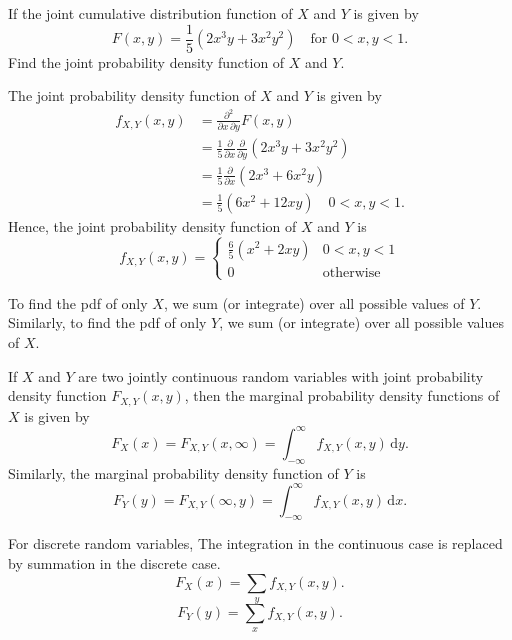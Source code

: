 \begin{example}
    If the joint cumulative distribution function of $X$ and $Y$ is given by 
    \[
        F(x, y) = \frac{1}{5} \left( 2x^3y + 3x^2y^2 \right) \quad 
        \text{for } 0 < x, y < 1.
    \]
    Find the joint probability density function of $X$ and $Y$.
\end{example}
\begin{solution}
    The joint probability density function of $X$ and $Y$ is given by
    \begin{align*}
        f_{X,Y}(x,y) &= \frac{\partial^2}{\partial x \, \partial y} F(x,y)\\
        &= \frac{1}{5} \frac{\partial}{\partial x} \frac{\partial}{\partial y} (2x^3 y + 3x^2 y^2)\\
        &= \frac{1}{5} \frac{\partial}{\partial x} \left( 2x^3 + 6x^2y \right)\\
        &= \frac{1}{5} \left( 6x^2 + 12xy \right) \quad 0 < x, y < 1.
    \end{align*}
    Hence, the joint probability density function of $X$ and $Y$ is
    \[
        f_{X,Y}(x,y) = \begin{cases}
            \displaystyle \frac{6}{5} \left( x^2 + 2xy \right) & 0 < x, y < 1\\[0.6em]
            0 & \text{otherwise}
        \end{cases}
    \]
\end{solution}

To find the pdf of only $X$, we sum (or integrate) over all possible values of $Y$. 
Similarly, to find the pdf of only $Y$, we sum (or integrate) over all possible values of $X$.

\begin{definition}
    If $X$ and $Y$ are two jointly continuous random variables with joint probability density function $F_{X,Y}(x,y)$, then the marginal probability density functions of $X$ is given by
    \begin{equation}
        F_X(x) = F_{X,Y}(x, \infty) = \int_{- \infty}^{\infty} f_{X,Y}(x,y) \, \mathrm{d}y.
    \end{equation}
    Similarly, the marginal probability density function of $Y$ is 
    \begin{equation}
        F_Y(y) = F_{X,Y}(\infty, y) = \int_{- \infty}^{\infty} f_{X,Y}(x,y) \, \mathrm{d}x.
    \end{equation}
\end{definition}
\begin{remark}
    For discrete random variables, 
    The integration in the continuous case is replaced by summation in the discrete case.
    \begin{equation}
        F_X(x) = \sum_{y} f_{X,Y}(x,y).
    \end{equation}
    \begin{equation}
        F_Y(y) = \sum_{x} f_{X,Y}(x,y).
    \end{equation}
\end{remark}

